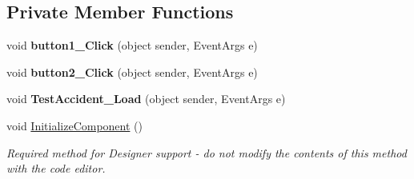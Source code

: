 \subsection*{Private Member Functions}
\begin{DoxyCompactItemize}
\item 
\mbox{\label{class_statystyki___o_s_p_1_1_accident_form_a8a76ddb155e5cd73fbcf6fe354437407}} 
void {\bfseries button1\+\_\+\+Click} (object sender, Event\+Args e)
\item 
\mbox{\label{class_statystyki___o_s_p_1_1_accident_form_ac96e67a8172c12c5530d1de6307184d5}} 
void {\bfseries button2\+\_\+\+Click} (object sender, Event\+Args e)
\item 
\mbox{\label{class_statystyki___o_s_p_1_1_accident_form_a99d0baee47588a1ee0d7ed9ef4818a95}} 
void {\bfseries Test\+Accident\+\_\+\+Load} (object sender, Event\+Args e)
\item 
void \mbox{\hyperlink{class_statystyki___o_s_p_1_1_accident_form_a48cf3cd4afd1e861644da9a2a311834c}{Initialize\+Component}} ()
\begin{DoxyCompactList}\small\item\em Required method for Designer support -\/ do not modify the contents of this method with the code editor. \end{DoxyCompactList}\end{DoxyCompactItemize}
